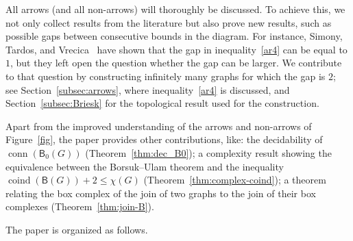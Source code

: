 \documentclass[12pt]{amsart}
\theoremstyle{definition}
\def\B{\mathsf{B}}
\renewcommand{\leq}{\leqslant}
\def\conn{\operatorname{conn}}
\def\coind{\operatorname{coind}}
\begin{document}
All arrows (and all non-arrows) will thoroughly be discussed. To achieve this, we not only collect results from the literature but also prove new results, such as possible gaps between consecutive bounds in the diagram. For instance, Simony, Tardos, and Vrecica~\cite{simonyi2009local} have shown that the gap in inequality~\eqref{ar4} can be equal to $1$, but they left open the question whether the gap can be larger. We contribute to that question by constructing infinitely many graphs for which the gap is $2$; see Section~\ref{subsec:arrows}, where inequality~\eqref{ar4} is discussed, and Section~\ref{subsec:Briesk} for the topological result used for the construction.

Apart from the improved understanding of the arrows and non-arrows of Figure~\ref{fig}, the paper provides other contributions, like: the decidability of $\conn(\B_0(G))$ (Theorem~\ref{thm:dec_B0}); a complexity result showing the equivalence between the Borsuk--Ulam theorem and the inequality $\coind(\B(G))+2 \leq \chi(G)$ (Theorem~\ref{thm:complex-coind}); a theorem relating the box complex of the join of two graphs to the join of their box complexes (Theorem~\ref{thm:join-B}).


The paper is organized as follows. 

\smallskip
\end{document}
